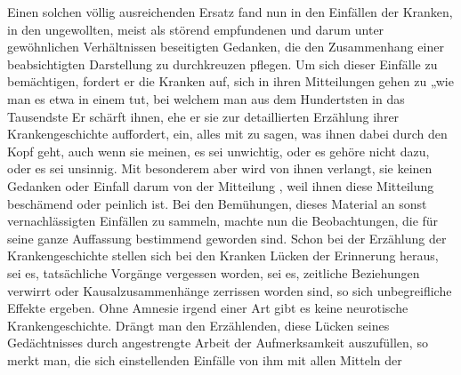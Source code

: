 \documentclass[twoside=true,titlepage=false,open=any, parskip=never, fontsize=10pt, headings=small, chapterprefix=false, appendixprefix=false]{scrbook}
\begin{document}
            
        \pstart
        Einen solchen völlig ausreichenden Ersatz fand nun  in den Einfällen der Kranken,  in den ungewollten, meist als störend empfundenen und darum unter
               gewöhnlichen Verhältnissen beseitigten Gedanken, die den Zusammenhang einer
               beabsichtigten Darstellung zu durchkreuzen pflegen. Um sich dieser Einfälle zu
               bemächtigen, fordert er die Kranken auf, sich in ihren Mitteilungen gehen zu „wie man es etwa in einem  tut, bei welchem man aus dem Hundertsten in das Tausendste  Er schärft ihnen, ehe er sie zur detaillierten Erzählung ihrer Krankengeschichte auffordert, ein, alles mit
               zu sagen, was ihnen dabei durch den Kopf geht, auch wenn sie meinen, es sei unwichtig, oder es gehöre nicht dazu, oder es sei
               unsinnig. Mit besonderem  aber wird von ihnen verlangt,  sie keinen Gedanken oder Einfall darum von der Mitteilung , weil ihnen diese Mitteilung beschämend oder peinlich ist. Bei den
               Bemühungen, dieses Material an sonst vernachlässigten Einfällen zu sammeln,
               machte nun  die Beobachtungen, die für
               seine ganze Auffassung bestimmend geworden sind. Schon bei der Erzählung der Krankengeschichte stellen
               sich bei den Kranken Lücken der Erinnerung heraus, sei es,  tatsächliche Vorgänge vergessen worden, sei es,  zeitliche Beziehungen verwirrt oder Kausalzusammenhänge zerrissen worden sind, so  sich unbegreifliche Effekte ergeben. Ohne Amnesie irgend einer Art gibt es keine neurotische
                  Krankengeschichte. Drängt man den Erzählenden, diese Lücken
               seines Gedächtnisses durch angestrengte Arbeit der Aufmerksamkeit auszufüllen, so merkt man,  die  sich einstellenden Einfälle von ihm mit allen Mitteln der
\end{document}

